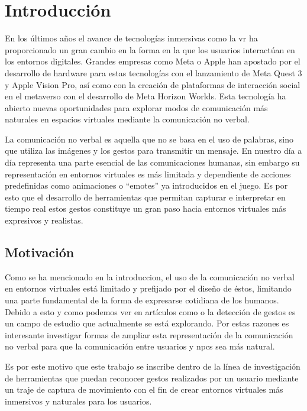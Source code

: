 \chapter{Introducción}
\label{cap:introduccion}


En los últimos años el avance de tecnologías inmersivas como la \gls{vr} ha proporcionado un gran cambio en la forma en la que los usuarios interactúan en los entornos digitales.
Grandes empresas como Meta o Apple han apostado por el desarrollo de hardware para estas tecnologías con el lanzamiento de Meta Quest 3 y Apple Vision Pro, así como con la creación de plataformas de interacción social en el \gls{metaverso} con el desarrollo de Meta Horizon Worlds.
Esta tecnología ha abierto nuevas oportunidades para explorar modos de comunicación más naturales en espacios virtuales mediante la comunicación no verbal.

La comunicación no verbal es aquella que no se basa en el uso de palabras, sino que utiliza las imágenes y los gestos para transmitir un mensaje.
En nuestro día a día representa una parte esencial de las comunicaciones humanas, sin embargo su representación en entornos virtuales es más limitada y dependiente de acciones predefinidas como animaciones o ``emotes'' ya introducidos en el juego.
Es por esto que el desarrollo de herramientas que permitan capturar e interpretar en tiempo real estos gestos constituye un gran paso hacia entornos virtuales más expresivos y realistas.


\section{Motivación}
Como se ha mencionado en la introduccion, el uso de la comunicación no verbal en entornos virtuales está limitado y prefijado por el diseño de éstos, limitando una parte fundamental de la forma de expresarse cotidiana de los humanos.
Debido a esto y como podemos ver en artículos como \cite{Neverova} o \cite{VRHANDS} la detección de gestos es un campo de estudio que actualmente se está explorando.
Por estas razones es interesante investigar formas de ampliar esta representación de la comunicación no verbal para que la comunicación entre usuarios y \glspl{npc} sea más natural.

Es por este motivo que este trabajo se inscribe dentro de la línea de investigación de herramientas que puedan reconocer gestos realizados por un usuario mediante un traje de captura de movimiento con el fin de crear entornos virtuales más inmersivos y naturales para los usuarios.

